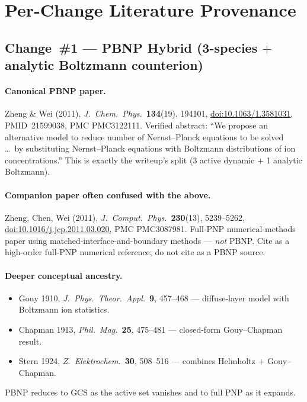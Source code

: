 \documentclass[11pt]{article}
\begin{document}
\section{Per-Change Literature Provenance}

\subsection{Change~\#1 --- PBNP Hybrid (3-species $+$ analytic Boltzmann counterion)}

\paragraph{Canonical PBNP paper.}
Zheng \& Wei (2011), \emph{J.~Chem.~Phys.}\ \textbf{134}(19), 194101,
\href{https://doi.org/10.1063/1.3581031}{doi:10.1063/1.3581031}, PMID~21599038,
PMC PMC3122111. Verified abstract: ``We propose an alternative model to reduce
number of Nernst--Planck equations to be solved \dots\ by substituting
Nernst--Planck equations with Boltzmann distributions of ion concentrations.''
This is exactly the writeup's split (3 active dynamic $+$ 1 analytic
Boltzmann).

\paragraph{Companion paper often confused with the above.}
Zheng, Chen, Wei (2011), \emph{J.~Comput.~Phys.}\ \textbf{230}(13),
5239--5262, \href{https://doi.org/10.1016/j.jcp.2011.03.020}{doi:10.1016/j.jcp.2011.03.020},
PMC PMC3087981. Full-PNP numerical-methods paper using
matched-interface-and-boundary methods --- \emph{not} PBNP. Cite as a high-order
full-PNP numerical reference; do not cite as a PBNP source.

\paragraph{Deeper conceptual ancestry.}
\begin{itemize}
\item Gouy 1910, \emph{J.~Phys.~Theor.~Appl.}\ \textbf{9}, 457--468 ---
      diffuse-layer model with Boltzmann ion statistics.
\item Chapman 1913, \emph{Phil.~Mag.}\ \textbf{25}, 475--481 --- closed-form
      Gouy--Chapman result.
\item Stern 1924, \emph{Z.~Elektrochem.}\ \textbf{30}, 508--516 --- combines
      Helmholtz $+$ Gouy--Chapman.
\end{itemize}
PBNP reduces to GCS as the active set vanishes and to full PNP as it expands.
\end{document}
